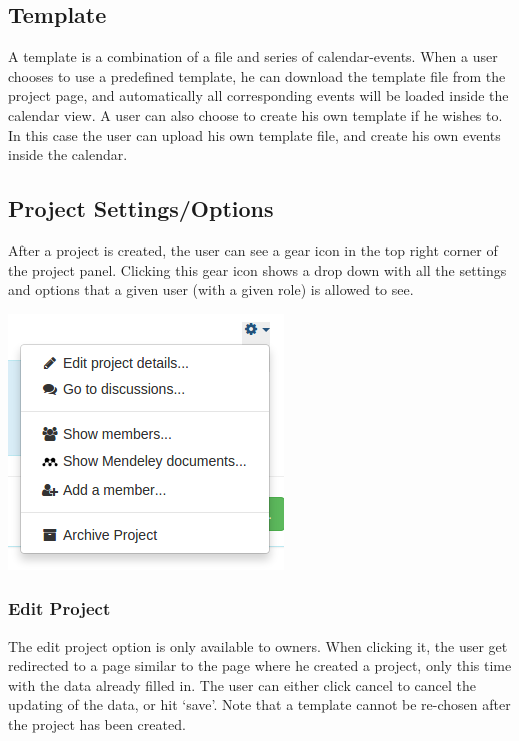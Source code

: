 \subsection{Template}
A template is a combination of a file and series of calendar-events. When a user chooses to use a predefined template, he can download the template file from the project page, and automatically all corresponding events will be loaded inside the calendar view. A user can also choose to create his own template if he wishes to. In this case the user can upload his own template file, and create his own events inside the calendar.

\subsection{Project Settings/Options}
After a project is created, the user can see a gear icon in the top right corner of the project panel. Clicking this gear icon shows a drop down with all the settings and options that a given user (with a given role) is allowed to see.

\begin{center}
\includegraphics[scale=0.5]{./img/project_dropdown.png}
\end{center}

\subsubsection{Edit Project}

The edit project option is only available to owners. When clicking it, the user get redirected to a page similar to the page where he created a project, only this time with the data already filled in. The user can either click cancel to cancel the updating of the data, or hit `save'. Note that a template cannot be re-chosen after the project has been created.

